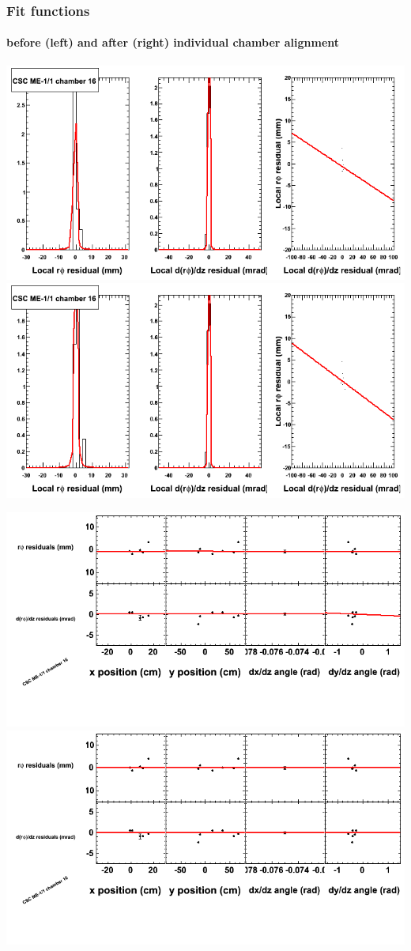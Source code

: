 \documentclass[compress]{beamer}
\begin{document}
\begin{frame}
\frametitle{Fit functions}
\framesubtitle{before (left) and after (right) individual chamber alignment}
\includegraphics[width=0.5\linewidth]{ringfits_3dof/beforefit_MEm11_16_bellcurve.png} \includegraphics[width=0.5\linewidth]{ringfits_3dof/afterfit_MEm11_16_bellcurve.png}

\includegraphics[width=0.5\linewidth]{ringfits_3dof/beforefit_MEm11_16_polynomials.png} \includegraphics[width=0.5\linewidth]{ringfits_3dof/afterfit_MEm11_16_polynomials.png}
\end{frame}
\end{document}
